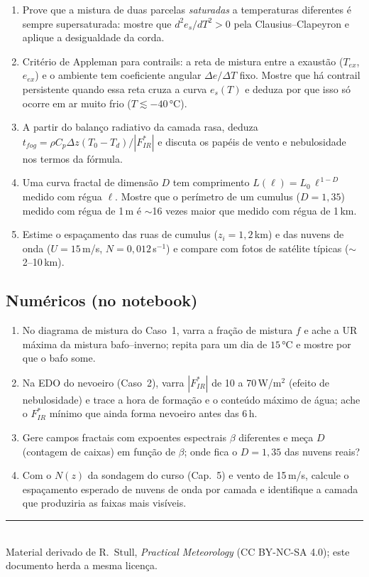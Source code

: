 \documentclass[11pt]{article}
\begin{document}
\begin{enumerate}[label=\textbf{T\arabic*.},itemsep=4pt]
  \item Prove que a mistura de duas parcelas \emph{saturadas} a
        temperaturas diferentes é sempre supersaturada: mostre que
        $d^2e_s/dT^2 > 0$ pela Clausius--Clapeyron e aplique a
        desigualdade da corda.
  \item Critério de Appleman para contrails: a reta de mistura entre a
        exaustão ($T_{ex}$, $e_{ex}$) e o ambiente tem coeficiente
        angular $\Delta e/\Delta T$ fixo. Mostre que há contrail
        persistente quando essa reta cruza a curva $e_s(T)$ e deduza por
        que isso só ocorre em ar muito frio ($T \lesssim -40\,°$C).
  \item A partir do balanço radiativo da camada rasa, deduza
        $t_{fog} = \rho C_p \Delta z (T_0-T_d)/|F^*_{IR}|$ e discuta os
        papéis de vento e nebulosidade nos termos da fórmula.
  \item Uma curva fractal de dimensão $D$ tem comprimento
        $L(\ell) = L_0\,\ell^{\,1-D}$ medido com régua $\ell$. Mostre
        que o perímetro de um cumulus ($D = 1{,}35$) medido com régua de
        1\,m é $\sim$16 vezes maior que medido com régua de 1\,km.
  \item Estime o espaçamento das ruas de cumulus ($z_i = 1{,}2$\,km) e
        das nuvens de onda ($U = 15$\,m/s, $N = 0{,}012$\,s$^{-1}$) e
        compare com fotos de satélite típicas ($\sim$2--10\,km).
\end{enumerate}

\subsection*{Numéricos (no notebook)}

\begin{enumerate}[label=\textbf{N\arabic*.},itemsep=4pt]
  \item No diagrama de mistura do Caso~1, varra a fração de mistura $f$
        e ache a UR máxima da mistura bafo--inverno; repita para um dia
        de $15\,°$C e mostre por que o bafo some.
  \item Na EDO do nevoeiro (Caso~2), varra $|F^*_{IR}|$ de 10 a
        70\,W/m$^2$ (efeito de nebulosidade) e trace a hora de formação
        e o conteúdo máximo de água; ache o $F^*_{IR}$ mínimo que ainda
        forma nevoeiro antes das 6\,h.
  \item Gere campos fractais com expoentes espectrais $\beta$ diferentes
        e meça $D$ (contagem de caixas) em função de $\beta$; onde fica
        o $D = 1{,}35$ das nuvens reais?
  \item Com o $N(z)$ da sondagem do curso (Cap.~5) e vento de 15\,m/s,
        calcule o espaçamento esperado de nuvens de onda por camada e
        identifique a camada que produziria as faixas mais visíveis.
\end{enumerate}

\vspace{1em}
\noindent\rule{\linewidth}{0.4pt}\\
{\scriptsize Material derivado de R.~Stull, \emph{Practical Meteorology}
(CC BY-NC-SA 4.0); este documento herda a mesma licença.}
\end{document}
